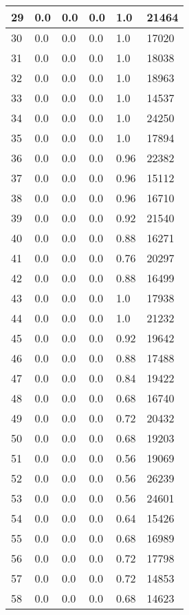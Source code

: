 \begin{longtable}{|l|l|l|l|l|l|}
29 & 0.0 & 0.0 & 0.0 & 1.0 & 21464 \\ \hline 
30 & 0.0 & 0.0 & 0.0 & 1.0 & 17020 \\ \hline 
31 & 0.0 & 0.0 & 0.0 & 1.0 & 18038 \\ \hline 
32 & 0.0 & 0.0 & 0.0 & 1.0 & 18963 \\ \hline 
33 & 0.0 & 0.0 & 0.0 & 1.0 & 14537 \\ \hline 
34 & 0.0 & 0.0 & 0.0 & 1.0 & 24250 \\ \hline 
35 & 0.0 & 0.0 & 0.0 & 1.0 & 17894 \\ \hline 
36 & 0.0 & 0.0 & 0.0 & 0.96 & 22382 \\ \hline 
37 & 0.0 & 0.0 & 0.0 & 0.96 & 15112 \\ \hline 
38 & 0.0 & 0.0 & 0.0 & 0.96 & 16710 \\ \hline 
39 & 0.0 & 0.0 & 0.0 & 0.92 & 21540 \\ \hline 
40 & 0.0 & 0.0 & 0.0 & 0.88 & 16271 \\ \hline 
41 & 0.0 & 0.0 & 0.0 & 0.76 & 20297 \\ \hline 
42 & 0.0 & 0.0 & 0.0 & 0.88 & 16499 \\ \hline 
43 & 0.0 & 0.0 & 0.0 & 1.0 & 17938 \\ \hline 
44 & 0.0 & 0.0 & 0.0 & 1.0 & 21232 \\ \hline 
45 & 0.0 & 0.0 & 0.0 & 0.92 & 19642 \\ \hline 
46 & 0.0 & 0.0 & 0.0 & 0.88 & 17488 \\ \hline 
47 & 0.0 & 0.0 & 0.0 & 0.84 & 19422 \\ \hline 
48 & 0.0 & 0.0 & 0.0 & 0.68 & 16740 \\ \hline 
49 & 0.0 & 0.0 & 0.0 & 0.72 & 20432 \\ \hline 
50 & 0.0 & 0.0 & 0.0 & 0.68 & 19203 \\ \hline 
51 & 0.0 & 0.0 & 0.0 & 0.56 & 19069 \\ \hline 
52 & 0.0 & 0.0 & 0.0 & 0.56 & 26239 \\ \hline 
53 & 0.0 & 0.0 & 0.0 & 0.56 & 24601 \\ \hline 
54 & 0.0 & 0.0 & 0.0 & 0.64 & 15426 \\ \hline 
55 & 0.0 & 0.0 & 0.0 & 0.68 & 16989 \\ \hline 
56 & 0.0 & 0.0 & 0.0 & 0.72 & 17798 \\ \hline 
57 & 0.0 & 0.0 & 0.0 & 0.72 & 14853 \\ \hline 
58 & 0.0 & 0.0 & 0.0 & 0.68 & 14623 \\ \hline 

\end{longtable}
